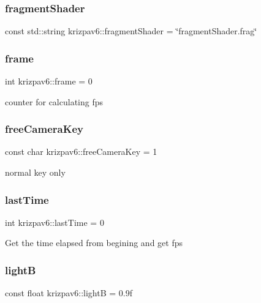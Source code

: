 \subsubsection{\texorpdfstring{fragmentShader}{fragmentShader}}
{\footnotesize\ttfamily const std\+::string krizpav6\+::fragment\+Shader = \char`\"{}fragment\+Shader.\+frag\char`\"{}}

\mbox{\label{namespacekrizpav6_a5f6efd918fbcd4a4055d6015bf9d4450}} 
\subsubsection{\texorpdfstring{frame}{frame}}
{\footnotesize\ttfamily int krizpav6\+::frame = 0}



counter for calculating fps 

\mbox{\label{namespacekrizpav6_a6da036bf12a0083d00955577300e1b17}} 
\subsubsection{\texorpdfstring{freeCameraKey}{freeCameraKey}}
{\footnotesize\ttfamily const char krizpav6\+::free\+Camera\+Key = \textquotesingle{}1\textquotesingle{}}



normal key only 

\mbox{\label{namespacekrizpav6_ab6e319d7be8daaf4ad161c0b83adf296}} 
\subsubsection{\texorpdfstring{lastTime}{lastTime}}
{\footnotesize\ttfamily int krizpav6\+::last\+Time = 0}

Get the time elapsed from begining and get fps \mbox{\label{namespacekrizpav6_a112b1f1367a7d4b3753573ab1d3a27c6}} 
\subsubsection{\texorpdfstring{lightB}{lightB}}
{\footnotesize\ttfamily const float krizpav6\+::lightB = 0.\+9f}



